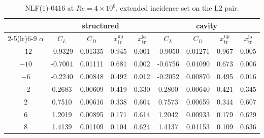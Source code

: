 \begin{table}[H]
  \centering\small
  \caption{NLF(1)-0416 at $Re=4\times10^6$, extended incidence set on the L2 pair.}
  \label{t:extnlfalpha}
  \begin{tabular}{c cccc cccc}
    \toprule
    & \multicolumn{4}{c}{structured} & \multicolumn{4}{c}{cavity} \\
    \cmidrule(lr){2-5}\cmidrule(lr){6-9}
    $\alpha$ & $C_L$ & $C_D$ & $x_\mathrm{tr}^\mathrm{up}$ & $x_\mathrm{tr}^\mathrm{lo}$
             & $C_L$ & $C_D$ & $x_\mathrm{tr}^\mathrm{up}$ & $x_\mathrm{tr}^\mathrm{lo}$ \\
    \midrule
    $-12$ & -0.9329 & 0.01335 & 0.945 & 0.001 & -0.9050 & 0.01271 & 0.967 & 0.005 \\
    $-10$ & -0.7004 & 0.01111 & 0.681 & 0.002 & -0.6756 & 0.01090 & 0.673 & 0.006 \\
    $-6$ & -0.2240 & 0.00848 & 0.492 & 0.012 & -0.2052 & 0.00870 & 0.495 & 0.016 \\
    $-2$ & 0.2683 & 0.00609 & 0.419 & 0.330 & 0.2800 & 0.00640 & 0.421 & 0.345 \\
    $2$ & 0.7510 & 0.00616 & 0.338 & 0.604 & 0.7573 & 0.00659 & 0.344 & 0.607 \\
    $6$ & 1.2019 & 0.00895 & 0.171 & 0.614 & 1.2042 & 0.00933 & 0.179 & 0.629 \\
    $8$ & 1.4139 & 0.01109 & 0.104 & 0.624 & 1.4137 & 0.01153 & 0.109 & 0.636 \\
    \bottomrule
  \end{tabular}
\end{table}
